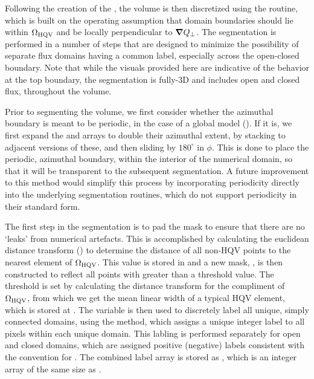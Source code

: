 \documentclass[10pt]{aastex62}
\newcommand{\grad}{\mbox{\boldmath$\nabla$}}
\begin{document}
\begin{itemize}
Following the creation of the , the volume is then discretized using the  routine, which is built on the operating assumption that domain boundaries should lie within $\Omega_{\rm HQV}$ and be locally perpendicular to $\grad Q_\perp$. 
The segmentation is performed in a number of steps that are designed to minimize the possibility of separate flux domains having a common label, especially across the open-closed boundary. 
Note that while the visuals provided here are indicative of the behavior at the top boundary, the segmentation is fully-3D and includes open and closed flux, throughout the volume.

Prior to segmenting the volume, we first consider whether the azimuthal boundary is meant to be periodic, in the case of a global model (). 
If it is, we first expand the  and  arrays to double their azimuthal extent, by stacking to adjacent versions of these, and then sliding by $180^\circ$ in $\phi$. 
This is done to place the periodic, azimuthal boundary, within the interior of the numerical domain, so that it will be transparent to the subsequent segmentation.
A future improvement to this method would simplify this process by incorporating periodicity directly into the underlying segmentation routines, which do not support periodicity in their standard form.

The first step in the segmentation is to pad the mask to ensure that there are no `leaks' from numerical artefacts.
This is accomplished by calculating the euclidean distance transform () to determine the distance of all non-HQV points to the nearest element of $\Omega_{\rm HQV}$. 
This value is stored in  and a new mask, , is then constructed to reflect all points with  greater than a threshold value. 
The threshold is set by calculating the distance transform for the compliment of $\Omega_{\rm HQV}$, from which we get the mean linear width of a typical HQV element, which is stored at .
The  variable is then used to discretely label all unique, simply connected domains, using the  method, which assigns a unique integer label to all pixels within each unique domain.
This labling is performed separately for open and closed domains, which are assigned positive (negative) labels consistent with the convention for . 
The combined label array is stored as , which is an integer array of the same size as .


\end{itemize}
\end{document}
